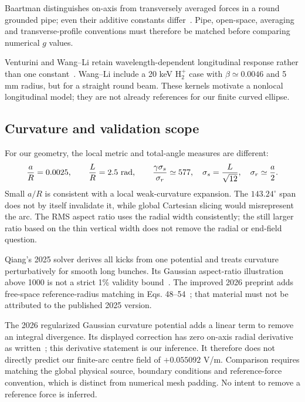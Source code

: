 Baartman distinguishes on-axis from transversely averaged forces in a round
grounded pipe; even their additive constants differ~\cite{baartman}.
Pipe, open-space, averaging and transverse-profile conventions must therefore
be matched before comparing numerical $g$ values.

Venturini and Wang--Li retain wavelength-dependent longitudinal response
rather than one constant~\cite{venturini,wangli}. Wang--Li include a 20 keV
$\mathrm H_2^+$ case with $\beta\simeq0.0046$ and 5 mm radius, but for a
straight round beam. These kernels motivate a nonlocal longitudinal model; they are not
already references for our finite curved ellipse.

\clearpage
\subsection{Curvature and validation scope}
For our geometry, the local metric and total-angle measures are different:
\begin{equation}
 \frac{a}{R}=0.0025,\qquad \frac{L}{R}=2.5\ {\rm rad},\qquad
 \frac{\gamma\sigma_s}{\sigma_r}\simeq577,
 \quad \sigma_s=\frac{L}{\sqrt{12}},\quad\sigma_r\simeq\frac a2.
 \label{eq:literature-geometry}
\end{equation}
Small $a/R$ is consistent with a local weak-curvature expansion. The
$143.24^\circ$ span does not by itself invalidate it, while global Cartesian
slicing would misrepresent the arc. The RMS aspect ratio uses the radial
width consistently; the still larger ratio based on the thin vertical width
does not remove the radial or end-field question.

Qiang's 2025 solver derives all kicks from one potential and treats curvature
perturbatively for smooth long bunches. Its Gaussian aspect-ratio illustration
above 1000 is not a strict 1\% validity bound~\cite{qiang2025}.
The improved 2026 preprint adds free-space reference-radius matching in
Eqs. 48--54~\cite{qiang2026}; that material must not be attributed to the
published 2025 version.

The 2026 regularized Gaussian curvature potential adds a linear term to
remove an integral divergence. Its displayed correction has zero on-axis
radial derivative as written~\cite{qiang2026}; this derivative statement is
our inference. It therefore does not directly predict our finite-arc centre
field of $+0.055092$ V/m. Comparison requires matching the global physical
source, boundary conditions and reference-force convention, which is distinct
from numerical mesh padding. No intent to remove a reference force is inferred.

